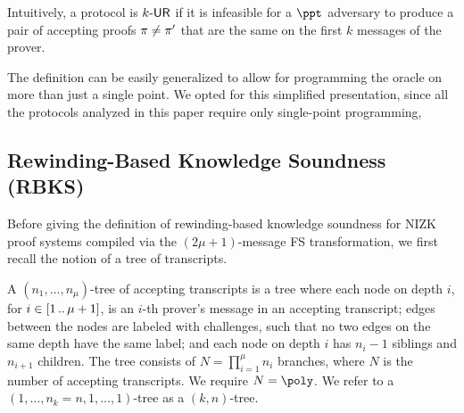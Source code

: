 Intuitively, a protocol is ${k\text{-}\mathsf{UR}}$ if it is infeasible for a $\ppt$ adversary to produce a pair of accepting proofs $\pi \neq \pi'$ that are the same on the first $k$ messages of the prover.  

The definition can be easily generalized to allow for programming the oracle on more than just a single point. We opted for this simplified presentation, since all the protocols analyzed in this paper require only single-point programming, 
  

\subsection{Rewinding-Based Knowledge Soundness (RBKS)}

Before giving the definition of rewinding-based knowledge soundness for NIZK proof systems compiled via the $(2\mu + 1)$-message FS transformation, we first recall the notion of a tree of transcripts.
\begin{definition}
	\label{def:tree_of_accepting_transcripts}
	A $(n_1,
  \ldots, n_\mu)$-tree of accepting transcripts is a tree where each node on
  depth $i$, for $i \in [1 \, .. \, \mu + 1]$, is an $i$-th prover's message in an
  accepting transcript; edges between the nodes are labeled with
  challenges, such that no two edges on the same depth have the same
  label; and each node on depth $i$ has $n_{i} - 1$ siblings and $n_{i +
    1}$ children. The tree consists of $N = \prod_{i = 1}^\mu n_i$
  branches, where $N$ is the number of accepting transcripts. We require $N = \poly$. We refer to a $(1, \ldots, n_k=n, 1, \ldots, 1)$-tree as a $(k,n)$-tree.
\end{definition}

\iffalse
		
